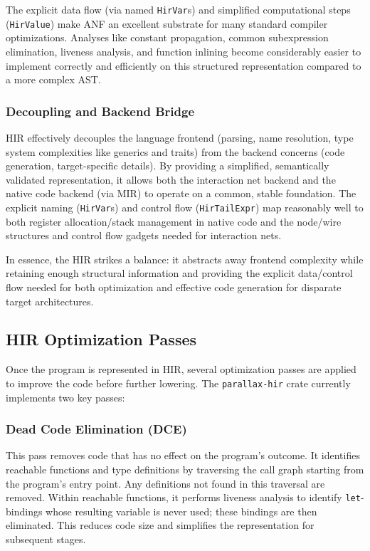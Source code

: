 The explicit data flow (via named \texttt{HirVar}s) and simplified computational steps (\texttt{HirValue}) make ANF an excellent substrate for many standard compiler optimizations. Analyses like constant propagation, common subexpression elimination, liveness analysis, and function inlining become considerably easier to implement correctly and efficiently on this structured representation compared to a more complex AST.

\subsubsection{Decoupling and Backend Bridge}

HIR effectively decouples the language frontend (parsing, name resolution, type system complexities like generics and traits) from the backend concerns (code generation, target-specific details). By providing a simplified, semantically validated representation, it allows both the interaction net backend and the native code backend (via MIR) to operate on a common, stable foundation. The explicit naming (\texttt{HirVar}s) and control flow (\texttt{HirTailExpr}) map reasonably well to both register allocation/stack management in native code and the node/wire structures and control flow gadgets needed for interaction nets.

In essence, the HIR strikes a balance: it abstracts away frontend complexity while retaining enough structural information and providing the explicit data/control flow needed for both optimization and effective code generation for disparate target architectures.

\subsection{HIR Optimization Passes}

Once the program is represented in HIR, several optimization passes are applied to improve the code before further lowering. The \texttt{parallax-hir} crate currently implements two key passes:

\subsubsection{Dead Code Elimination (DCE)}
This pass removes code that has no effect on the program's outcome. It identifies reachable functions and type definitions by traversing the call graph starting from the program's entry point. Any definitions not found in this traversal are removed. Within reachable functions, it performs liveness analysis to identify \texttt{let}-bindings whose resulting variable is never used; these bindings are then eliminated. This reduces code size and simplifies the representation for subsequent stages.

